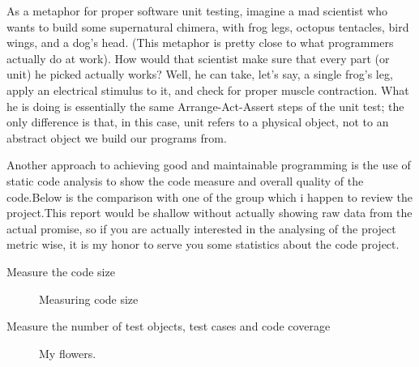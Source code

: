 \documentclass{article}
\begin{document}
{As a metaphor for proper software unit testing, imagine a mad scientist who wants to build some supernatural chimera, with frog legs, octopus tentacles, bird wings, and a dog’s head. (This metaphor is pretty close to what programmers actually do at work). How would that scientist make sure that every part (or unit) he picked actually works? Well, he can take, let’s say, a single frog’s leg, apply an electrical stimulus to it, and check for proper muscle contraction. What he is doing is essentially the same Arrange-Act-Assert steps of the unit test; the only difference is that, in this case, unit refers to a physical object, not to an abstract object we build our programs from.

Another approach to achieving good and maintainable programming is the use of static code analysis to show the code measure and overall quality of the code.Below is the comparison with one of the group which i happen to review the  project.This report would be shallow without actually showing raw data from the actual promise, so if you are actually interested in the analysing of the project metric wise, it is my honor to serve you some statistics about the code project.

Measure the code size
\begin{figure}[h!]
  \centering
  \hfill
  \caption{Measuring code size}
\end{figure}


Measure the number of test objects, test cases and code coverage
\begin{figure}[h!]
  \centering
  \hfill
  \caption{My flowers.}
\end{figure}

}
\end{document}

